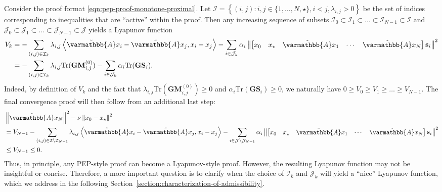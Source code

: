 \documentclass{article}
\theoremstyle{definition}
\theoremstyle{plain}
\newcommand{\vs}{{\mathbf{s}}}
\newcommand{\vG}{{\mathbf{G}}}
\newcommand{\vM}{{\mathbf{M}}}
\newcommand{\vS}{{\mathbf{S}}}
\newcommand{\cI}{{\mathcal{I}}}
\newcommand{\cJ}{{\mathcal{J}}}
\newcommand{\Tr}{{\mathrm{Tr}}}
\newcommand{\opA}{{\varmathbb{A}}}
\newcommand{\inprod}[2]{\left\langle #1,#2 \right\rangle}
\newcommand{\sqnorm}[1]{\left\| #1 \right\|^2}
\newcommand{\topa}{\tilde{\opA}}
\begin{document}
Consider the proof format \eqref{eqn:pep-proof-monotone-proximal}. 
Let $\cI = \left\{(i,j): i,j \in \{1,\dots,N,\star\}, i < j , \lambda_{i,j} > 0 \right\}$ be the set of indices corresponding to inequalities that are ``active'' within the proof.
Then any increasing sequence of subsets $\cI_0 \subset \cI_1 \subset \dots \subset \cI_{N-1} \subset \cI$ and $\cJ_0 \subset \cJ_1 \subset \dots \subset \cJ_{N-1} \subset \cJ$ 
yields a Lyapunov function
\begin{align}
\label{eqn:Vk-definition-monotone-proximal}
\begin{aligned}
    V_k & = -\sum_{(i,j) \in \cI_k} \lambda_{i,j} \inprod{\topa x_i - \topa x_j}{x_i - x_j} - \sum_{i\in \cJ_k} \alpha_i \sqnorm{\begin{bmatrix} x_0 & x_\star & \topa x_1 & \cdots & \topa x_N \end{bmatrix} \vs_i} \\
    & = -\sum_{(i,j) \in \cI_k} \lambda_{i,j} \Tr(\vG\vM^{(0)}_{i,j}) - \sum_{i\in\cJ_k} \alpha_i \Tr(\vG\vS_i) .
\end{aligned}
\end{align}
Indeed, by definition of $V_k$ and the fact that $\lambda_{i,j} \Tr(\vG\vM^{(0)}_{i,j}) \ge 0$ and $\alpha_i \Tr(\vG\vS_i) \ge 0$, we naturally have $0 \ge V_0 \ge V_1 \ge \dots \ge V_{N-1}$.
The final convergence proof will then follow from an additional last step:
\begin{align*}
    & \sqnorm{\topa x_N} - \nu \sqnorm{x_0 - x_\star} \\
    & = V_{N-1} - \sum_{(i,j) \in \cI\setminus \cI_{N-1}} \lambda_{i,j} \inprod{\topa x_i - \topa x_j}{x_i - x_j}  - \sum_{i\in \cJ \setminus \cJ_{N-1}} \alpha_i \sqnorm{\begin{bmatrix} x_0 & x_\star & \topa x_1 & \cdots & \topa x_N \end{bmatrix} \vs_i} \\
    & \le V_{N-1} \le 0 .
\end{align*}
Thus, in principle, any PEP-style proof can become a Lyapunov-style proof.
However, the resulting Lyapunov function may not be insightful or concise.
Therefore, a more important question is to clarify when the choice of $\cI_k$ and $\cJ_k$ will yield a ``nice'' Lyapunov function, which we address in the following Section~\ref{section:characterization-of-admissibility}.
\end{document}
